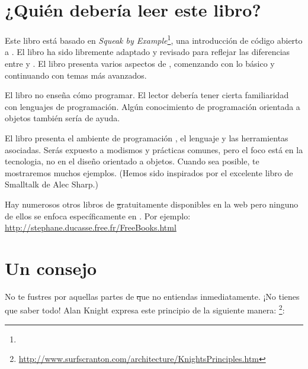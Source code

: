 \documentclass[a4paper,spanish, 10pt,twoside]{book}
\begin{document}
\section*{¿Quién debería leer este libro?}

Este libro está basado en \emph{Squeak by Example}\footnote{\sbe}, una introducción de código abierto a \squeak.
El libro ha sido libremente adaptado y revisado para reflejar las diferencias entre \pharo y \squeak.
El libro presenta varios aspectos de \pharo, comenzando con lo básico y continuando con temas más avanzados.

El libro no enseña cómo programar. El lector debería tener cierta familiaridad con lenguajes de programación. Algún conocimiento de programación orientada a objetos también sería de ayuda.

El libro presenta el ambiente de programación \pharo, el lenguaje y las herramientas asociadas. Serás expuesto a modismos y prácticas comunes, pero el foco está en la tecnologia, no en el diseño orientado a objetos. Cuando sea posible, te mostraremos muchos ejemplos. (Hemos sido inspirados por el excelente libro de Smalltalk\cite{Shar97a} de Alec Sharp.)

Hay numerosos otros libros  de \st gratuitamente disponibles en la web pero ninguno de ellos se enfoca específicamente en \pharo. Por ejemplo:
\url{http://stephane.ducasse.free.fr/FreeBooks.html}

\ifluluelse{}{\newpage} %
\section*{Un consejo}


No te fustres por aquellas partes de \st que no entiendas inmediatamente.
¡No tienes que saber todo!
Alan Knight expresa este principio de la siguiente manera: \footnote{\url{http://www.surfscranton.com/architecture/KnightsPrinciples.htm}}:
\end{document}
